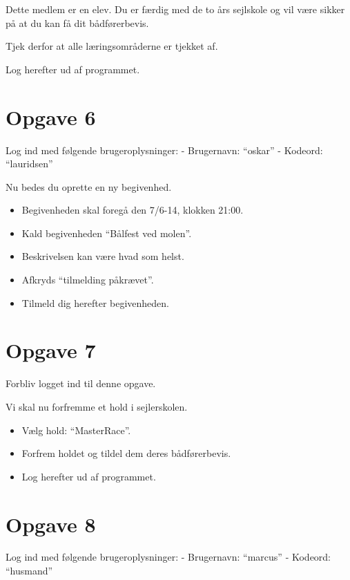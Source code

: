 Dette medlem er en elev. Du er færdig med de to års sejlskole og vil være sikker på at du kan få dit bådførerbevis.

Tjek derfor at alle læringsområderne er tjekket af.

Log herefter ud af programmet.


\section{Opgave 6} 

Log ind med følgende brugeroplysninger: 
\newline - Brugernavn: ``oskar''
\newline - Kodeord: ``lauridsen''

Nu bedes du oprette en ny begivenhed.

\begin{itemize}
\item Begivenheden skal foregå den 7/6-14, klokken 21:00.
\item Kald begivenheden ``Bålfest ved molen''.
\item Beskrivelsen kan være hvad som helst.
\item Afkryds ``tilmelding påkrævet''.
\item Tilmeld dig herefter begivenheden.
\end{itemize}

\section{Opgave 7}

Forbliv logget ind til denne opgave.

Vi skal nu forfremme et hold i sejlerskolen.

\begin{itemize}
\item Vælg hold: ``MasterRace''.
\item Forfrem holdet og tildel dem deres bådførerbevis.
\item Log herefter ud af programmet.
\end{itemize}

\section{Opgave 8}

Log ind med følgende brugeroplysninger: 
\newline - Brugernavn: ``marcus''
\newline - Kodeord: ``husmand''

